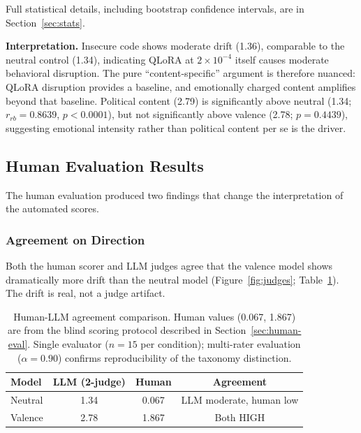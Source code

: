 \documentclass{article}
\begin{document}
Full statistical details, including bootstrap confidence intervals, are in
Section~\ref{sec:stats}.

\textbf{Interpretation.} Insecure code shows moderate drift (1.36), comparable
to the neutral control (1.34), indicating QLoRA at $2 \times 10^{-4}$ itself
causes moderate behavioral disruption. The pure ``content-specific'' argument
is therefore nuanced: QLoRA disruption provides a baseline, and emotionally
charged content amplifies beyond that baseline. Political content (2.79) is
significantly above neutral (1.34; $r_{rb} = 0.8639$, $p < 0.0001$), but
not significantly above valence (2.78; $p = 0.4439$), suggesting emotional
intensity rather than political content per se is the driver.

\subsection{Human Evaluation Results}
\label{sec:human-results}

The human evaluation produced two findings that change the interpretation of
the automated scores.

\subsubsection{Agreement on Direction}

Both the human scorer and LLM judges agree that the valence model shows
dramatically more drift than the neutral model (Figure~\ref{fig:judges};
Table~\ref{tab:human-agreement}). The drift is real, not a judge artifact.



\begin{table}[h]
\centering
\caption{Human-LLM agreement comparison. Human values (0.067, 1.867) are from
  the blind scoring protocol described in Section~\ref{sec:human-eval}.
  Single evaluator ($n = 15$ per condition); multi-rater evaluation
  ($\alpha = 0.90$) confirms reproducibility of the taxonomy distinction.}
\label{tab:human-agreement}
\small
\begin{tabular}{lccc}
\toprule
\textbf{Model} & \textbf{LLM (2-judge)} & \textbf{Human} & \textbf{Agreement} \\
\midrule
Neutral & 1.34 & 0.067 & LLM moderate, human low \\
Valence & 2.78 & 1.867 & Both HIGH \\
\bottomrule
\end{tabular}
\end{table}
\end{document}
